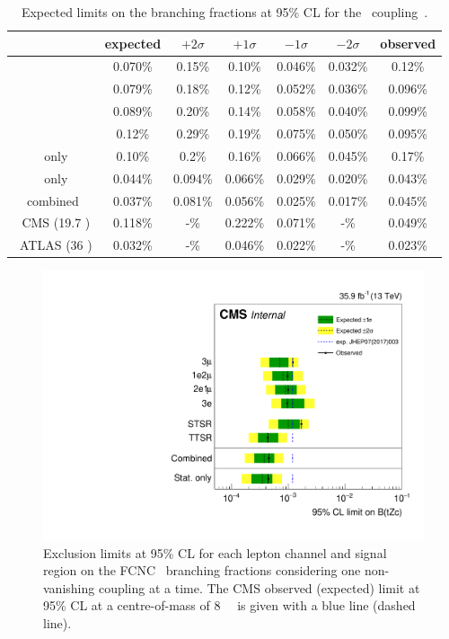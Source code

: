 \begin{table}[htbp]
	\centering
	\caption{Expected limits on the branching fractions at 95\% CL for the \Zct\ coupling~\cite{Sirunyan:2017kkr,ATLAS-CONF-2017-070}.}
	\begin{tabular}{ccccccc}
		\toprule
		& expected & $+2\sigma$ & $+1\sigma$ & $-1\sigma$ & $-2\sigma$ & observed \\ 
		\midrule
		\mumumu\ & 0.070\% & 0.15\% & 0.10\% & 0.046\% & 0.032\% & 0.12\% \\ 
		
		\emumu\ & 0.079\% & 0.18\% & 0.12\% & 0.052\% & 0.036\% & 0.096\% \\ 
		
		\eemu\ & 0.089\% & 0.20\% & 0.14\% & 0.058\% & 0.040\% & 0.099\% \\ 
		
		\eee\ & 0.12\% & 0.29\% & 0.19\% & 0.075\% & 0.050\% & 0.095\% \B\\ 
		\hdashline
		\STSR\ only & 0.10\% & 0.2\% & 0.16\% & 0.066\% & 0.045\% & 0.17\% \T \\ 
		
		\TTSR\ only & 0.044\% & 0.094\% & 0.066\% & 0.029\% & 0.020\% & 0.043\% \B \\ 
		\hdashline 
		combined & 0.037\% & 0.081\% & 0.056\% & 0.025\% & 0.017\% & 0.045\% \T\B\\ 
		\hdashline
		8 \TeV\ CMS (19.7 \fbinv)    & 0.118\% & -\% &0.222\% & 0.071\% & -\% & 0.049\% \T\B\\
		\hdashline
		13 \TeV\ ATLAS (36 \fbinv)    & 0.032\% & -\% & 0.046\% & 0.022\%& -\% & 0.023\% \T\\
		\hline
	\end{tabular} 
	\label{tab:ResultsTZC}
\end{table}
\begin{figure}[htbp]
	\centering
	\includegraphics[width=0.7\linewidth]{6_Search/Figures/TOP-17-017_limitsZctStat.pdf}
	\caption{Exclusion limits at 95\% CL for each lepton channel and signal region on the FCNC \Zct\ branching fractions considering one non-vanishing coupling at a time. The CMS observed (expected) limit at 95\% CL at a centre-of-mass of 8~\TeV~\cite{Sirunyan:2017kkr} is given with a blue line (dashed line).}	
	\label{fig:exclusionlimitbrcompc}
\end{figure}

